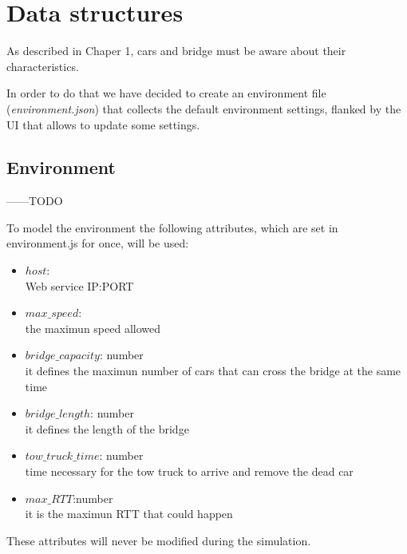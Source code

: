\section{Data structures}

As described in Chaper 1, cars and bridge must be aware about their characteristics.

In order to do that we have decided to create an environment file 
(\textit{environment.json}) that collects the default environment settings,
flanked by the UI that allows to update some settings.   


\subsection{Environment}
------TODO

To model the environment the following attributes, which are set in environment.js for once, will be used:
\begin{itemize}
    \item $host$:\\ Web service IP:PORT
    \item $max\_speed$:\\ the maximun speed allowed
    \item $bridge\_capacity$: number\\ it defines the maximun number of cars that can cross the bridge
    at the same time
    \item $bridge\_length$: number\\ it defines the length of the bridge
    \item $tow\_truck\_time$: number\\ time necessary for the tow truck to arrive and remove the dead car
    \item $max\_RTT$:number\\ it is the maximun RTT that could happen
\end{itemize}

These attributes will never be modified during the simulation.


